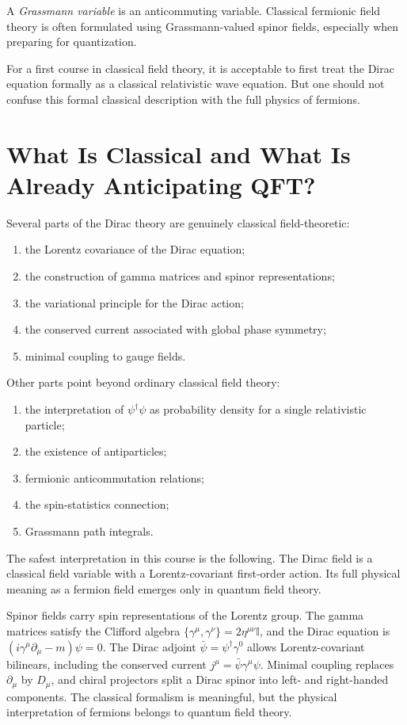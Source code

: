 \begin{definitionbox}
A \emph{Grassmann variable} is an anticommuting variable. Classical fermionic
field theory is often formulated using Grassmann-valued spinor fields, especially
when preparing for quantization.
\end{definitionbox}

For a first course in classical field theory, it is acceptable to first treat the
Dirac equation formally as a classical relativistic wave equation. But one should
not confuse this formal classical description with the full physics of fermions.

\section{What Is Classical and What Is Already Anticipating QFT?}

Several parts of the Dirac theory are genuinely classical field-theoretic:
\begin{enumerate}
    \item the Lorentz covariance of the Dirac equation;
    \item the construction of gamma matrices and spinor representations;
    \item the variational principle for the Dirac action;
    \item the conserved current associated with global phase symmetry;
    \item minimal coupling to gauge fields.
\end{enumerate}

Other parts point beyond ordinary classical field theory:
\begin{enumerate}
    \item the interpretation of \(\psi^\dagger\psi\) as probability density for a
    single relativistic particle;
    \item the existence of antiparticles;
    \item fermionic anticommutation relations;
    \item the spin-statistics connection;
    \item Grassmann path integrals.
\end{enumerate}

The safest interpretation in this course is the following. The Dirac field is a
classical field variable with a Lorentz-covariant first-order action. Its full
physical meaning as a fermion field emerges only in quantum field theory.

\begin{summarybox}
Spinor fields carry spin representations of the Lorentz group. The gamma
matrices satisfy the Clifford algebra
\(\{\gamma^\mu,\gamma^\nu\}=2\eta^{\mu\nu}\mathbb{I}\), and the Dirac equation is
\((i\gamma^\mu\partial_\mu-m)\psi=0\). The Dirac adjoint
\(\bar\psi=\psi^\dagger\gamma^0\) allows Lorentz-covariant bilinears, including
the conserved current \(j^\mu=\bar\psi\gamma^\mu\psi\). Minimal coupling replaces
\(\partial_\mu\) by \(D_\mu\), and chiral projectors split a Dirac spinor into
left- and right-handed components. The classical formalism is meaningful, but
the physical interpretation of fermions belongs to quantum field theory.
\end{summarybox}
